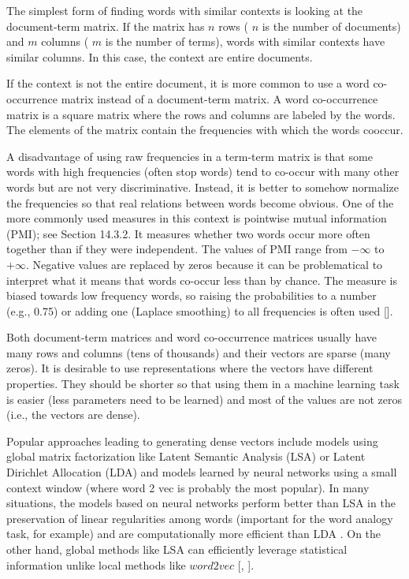 The simplest form of finding words with similar contexts is looking at the document-term matrix. If the matrix has $n$ rows ( $n$ is the number of documents) and $m$ columns ( $m$ is the number of terms), words with similar contexts have similar columns. In this case, the context are entire documents.

If the context is not the entire document, it is more common to use a word co-occurrence matrix instead of a document-term matrix. A word co-occurrence matrix is a square matrix where the rows and columns are labeled by the words. The elements of the matrix contain the frequencies with which the words cooccur.

A disadvantage of using raw frequencies in a term-term matrix is that some words with high frequencies (often stop words) tend to co-occur with many other words but are not very discriminative. Instead, it is better to somehow normalize the frequencies so that real relations between words become obvious. One of the more commonly used measures in this context is pointwise mutual information (PMI); see Section 14.3.2. It measures whether two words occur more often together than if they were independent. The values of PMI range from $-\infty$ to $+\infty$. Negative values are replaced by zeros because it can be problematical to interpret what it means that words co-occur less than by chance. The measure is biased towards low frequency words, so raising the probabilities to a number (e.g., 0.75) or adding one (Laplace smoothing) to all frequencies is often used [\cite{ref138}].

Both document-term matrices and word co-occurrence matrices usually have many rows and columns (tens of thousands) and their vectors are sparse (many zeros). It is desirable to use representations where the vectors have different properties. They should be shorter so that using them in a machine learning task is easier (less parameters need to be learned) and most of the values are not zeros (i.e., the vectors are dense).

Popular approaches leading to generating dense vectors include models using global matrix factorization like Latent Semantic Analysis (LSA) or Latent Dirichlet Allocation (LDA) and models learned by neural networks using a small context window (where word 2 vec is probably the most popular). In many situations, the models based on neural networks perform better than LSA in the preservation of linear regularities among words (important for the word analogy task, for example) and are computationally more efficient than LDA . On the other hand, global methods like LSA can efficiently leverage statistical information unlike local methods like $word2vec$ [\cite{ref195}, \cite{ref214}].

